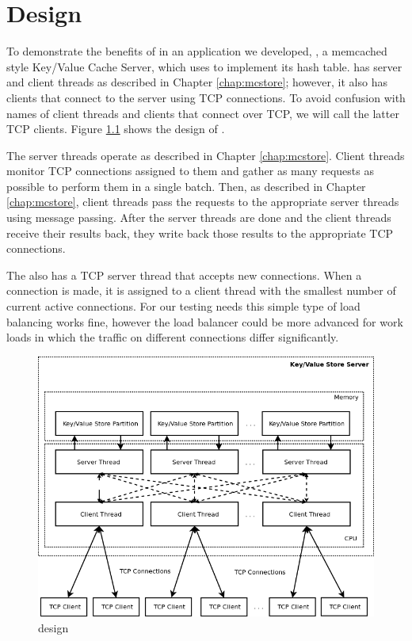 \chapter{\cpserver{} Design}
\label{chap:cpserver}

To demonstrate the benefits of \cphash{} in an application we developed, \cpserver{}, a memcached style
Key/Value Cache Server, which uses \cphash{} to implement its hash table.
\cpserver{} has server and client threads as described in Chapter \ref{chap:mcstore}; however,
it also has clients that connect to the server using TCP connections. To avoid confusion with names of client threads and
clients that connect over TCP, we will call the latter TCP clients. Figure \ref{fig:mcserver} shows the design of \cpserver{}.

The server threads operate as described in Chapter \ref{chap:mcstore}. Client threads monitor TCP connections assigned to them 
and gather as many requests as possible to perform them in a single batch. Then, as described in Chapter \ref{chap:mcstore}, client threads pass the 
requests to the appropriate server threads using message passing. After the server threads are done and the client threads receive their results back, they write back 
those results to the appropriate TCP connections. 

The \cpserver{} also has a TCP server thread that accepts new connections. When a connection is made, 
it is assigned to a client thread with the smallest number of current active connections. For our testing needs this simple type of load balancing works fine, 
however the load balancer could be more advanced for work loads in which the traffic on different connections differ significantly.


\begin{figure}[!ht]
  \centering
  \includegraphics[width=1.0\linewidth]{figs/mcserver.png}
  \caption{\cpserver{} design}
  \label{fig:mcserver}
\end{figure}

